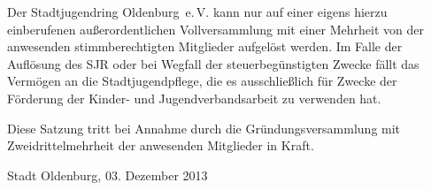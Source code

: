 \documentclass[10pt,a4paper,oneside,parskip=half]{scrartcl}
\begin{document}
\begin{contract}
Der Stadtjugendring Oldenburg~e.\,V. kann nur auf einer eigens hierzu einberufenen außerordentlichen Vollversammlung mit einer Mehrheit von  der anwesenden stimmberechtigten Mitglieder aufgelöst werden.
Im Falle der Auflösung des SJR oder bei Wegfall der steuerbegünstigten Zwecke fällt das Vermögen an die Stadtjugendpflege, die es ausschließlich für Zwecke der Förderung der Kinder- und Jugendverbandsarbeit zu verwenden hat.

Diese Satzung tritt bei Annahme durch die Gründungsversammlung mit Zweidrittelmehrheit der anwesenden Mitglieder in Kraft.

\end{contract}
\vspace{1cm}
Stadt Oldenburg, 03. Dezember 2013
\end{document}
